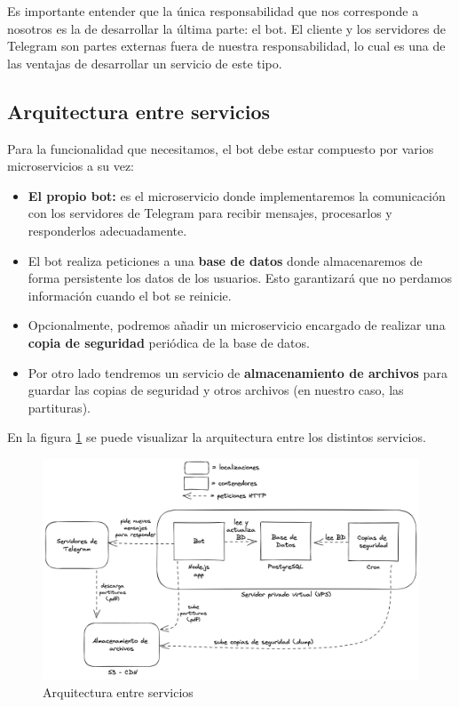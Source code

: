 Es importante entender que la única responsabilidad que nos corresponde a nosotros es la de desarrollar la última parte: el bot. El cliente y los servidores de Telegram son partes externas fuera de nuestra responsabilidad, lo cual es una de las ventajas de desarrollar un servicio de este tipo.




\subsection{Arquitectura entre servicios}

Para la funcionalidad que necesitamos, el bot debe estar compuesto por varios microservicios a su vez: 

\begin{itemize}
    \item \textbf{El propio bot:} es el microservicio donde implementaremos la comunicación con los servidores de Telegram para recibir mensajes, procesarlos y responderlos adecuadamente.
    \item El bot realiza peticiones a una \textbf{base de datos} donde almacenaremos de forma persistente los datos de los usuarios. Esto garantizará que no perdamos información cuando el bot se reinicie.
    \item Opcionalmente, podremos añadir un microservicio encargado de realizar una \textbf{copia de seguridad} periódica de la base de datos.
    \item Por otro lado tendremos un servicio de \textbf{almacenamiento de archivos} para guardar las copias de seguridad y otros archivos (en nuestro caso, las partituras).
\end{itemize}

En la figura \ref{fig:arquitecturaServicios} se puede visualizar la arquitectura entre los distintos servicios.

\begin{figure}[h]
\centering
\includegraphics[width=\textwidth]{imagenes/disenyo_tecnico/arquitectura_servicios.png}
\caption{Arquitectura entre servicios}
\label{fig:arquitecturaServicios}
\end{figure}

